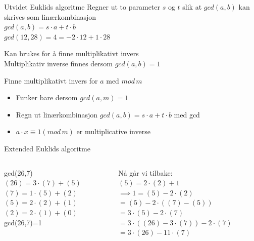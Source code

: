\begin{frame}[fragile]{}
\begin{block}{Utvidet Euklids algoritme}
Regner ut to parameter $s$ og $t$ slik at $gcd(a,b)$ kan skrives som linærkombinasjon\\
$gcd(a,b)=s\cdot a+t\cdot b$\\
$gcd(12,28)=4=-2\cdot 12 + 1\cdot 28$\medskip

Kan brukes for å finne multiplikativt invers\\
Multiplikativ inverse finnes dersom $gcd(a,b)=1$
\end{block}
\pause

\begin{block}{Finne multiplikativt invers for $a$ med $mod\, m$}
\begin{itemize}
\item Funker bare dersom $gcd(a,m)=1$\\
\item Regn ut linærkombinasjon $gcd(a,b)=s\cdot a+t\cdot b$ med gcd
\item $a\cdot x \equiv 1 (mod\, m)$ er multiplicative inverse
\end{itemize}
\end{block}
\end{frame}

\begin{frame}{Extended Euklids algoritme}
    \begin{columns}
        \begin{column}{0.45\textwidth}
             gcd(26,7)\\
             
             $(26)=3\cdot (7)+(5)$\\
             $(7)=1\cdot (5)+(2)$\\
             $(5)=2\cdot(2)+(1)$\\
             $(2)=2\cdot(1)+(0)$\\
             
             gcd(26,7)=1
        \end{column}
        \pause
        \begin{column}{0.45\textwidth}
            Nå går vi tilbake:\\
            $(5)=2\cdot(2)+1$\\
            
            $\implies 1=(5)-2\cdot (2)$\\
            $=(5)-2\cdot ((7)-(5))$\\
            $=3\cdot (5)-2\cdot(7)$\\
            $=3\cdot ((26)-3\cdot (7))-2\cdot (7)$\\
            $=3\cdot (26)-11\cdot (7)$
        \end{column}
    \end{columns}
\end{frame}


